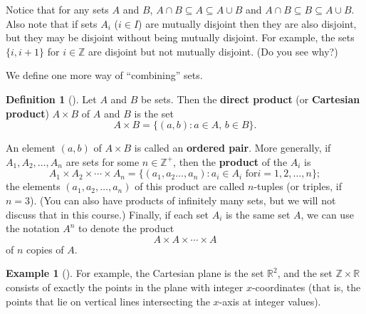 \documentclass[10pt,]{book}
\newcommand{\terminology}[1]{\textbf{#1}}
\theoremstyle{plain}
\theoremstyle{definition}
\newtheorem{definition}[theorem]{Definition}
\theoremstyle{definition}
\theoremstyle{definition}
\newtheorem{example}[theorem]{Example}
\theoremstyle{definition}
\numberwithin{equation}{section}
\def\Z{\mathbb{Z}}
\def\R{\mathbb{R}}
\begin{document}
Notice that for any sets \(A\) and \(B\), \(A\cap B \subseteq A \subseteq A\cup B\) and \(A\cap B \subseteq B \subseteq A\cup B\). Also note that if sets \(A_i\) (\(i \in I\)) are mutually disjoint then they are also disjoint, but they may be disjoint without being mutually disjoint. For example, the sets \(\{i, i+1\}\) for \(i\in \Z\) are disjoint but not mutually disjoint. (Do you see why?)%
\par
We define one more way of ``combining'' sets.%
\begin{definition}[{}]\label{definition-7}
Let \(A\) and \(B\) be sets. Then the \terminology{direct product} (or \terminology{Cartesian product}) \(A\times B\) of \(A\) and \(B\) is the set%
\begin{equation*}
A\times B =
\{(a,b): \text{\(a\in A\), \(b\in B\)} \}.
\end{equation*}
%
\par
An element \((a,b)\) of \(A\times B\) is called an \terminology{ordered pair}. More generally, if \(A_1, A_2, \ldots, A_n\) are sets for some \(n\in \Z^+\), then the \terminology{product} of the \(A_i\) is%
\begin{equation*}
A_1\times A_2 \times \cdots
\times A_n=\{(a_1, a_2 \ldots, a_n): a_i \in A_i \text{ for
} i=1,2, \ldots, n\}; 
\end{equation*}
the elements \((a_1,a_2,\ldots,a_n)\) of this product are called \(n\)-tuples (or triples, if \(n=3\)). (You can also have products of infinitely many sets, but we will not discuss that in this course.) Finally, if each set \(A_i\) is the same set \(A\), we can use the notation \(A^n\) to denote the product%
\begin{equation*}
A\times A \times \cdots \times A
\end{equation*}
of \(n\) copies of \(A\).%
\label{notation-22}
\end{definition}
\begin{example}[]\label{example-4}
For example, the Cartesian plane is the set \(\R^2\), and the set \(\Z \times \R\) consists of exactly the points in the plane with integer \(x\)-coordinates (that is, the points that lie on vertical lines intersecting the \(x\)-axis at integer values).%
\end{example}
\typeout{************************************************}
\typeout{************************************************}
\end{document}
